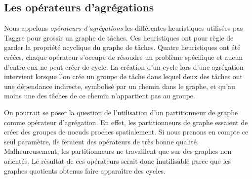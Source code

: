 \subsection{Les opérateurs d'agrégations}
Nous appelons {\em opérateurs d'agrégations} les différentes heuristiques utilisées pas Taggre pour grossir un graphe de tâches.
%
Ces heuristiques ont pour règle de garder la propriété acyclique du graphe de tâches.
%
Quatre heuristiques ont été créées, chaque opérateur s'occupe de résoudre un problème spécifique et aucun d'entre eux ne peut créer de cycle.
%
La création d'un cycle lors d'une agrégation intervient lorsque l'on crée un groupe de tâche dans lequel deux des tâches ont une dépendance indirecte, symbolisé par un chemin dans le graphe, et qu'au moins une des tâches de ce chemin n'appartient pas au groupe.

On pourrait se poser la question de l'utilisation d'un partitionneur de graphe comme opérateur d'agrégation.
%
En effet, les partitionneurs de graphe essaient de créer des groupes de noeuds proches spatialement.
%
Si nous prenons en compte ce seul paramètre, ils feraient des opérateurs de très bonne qualité.
%
Malheureusement, les partitionneurs ne travaillent que sur des graphes non orientés.
%
Le résultat de ces opérateurs serait donc inutilisable parce que les graphes quotients obtenus faire apparaître des cycles.
